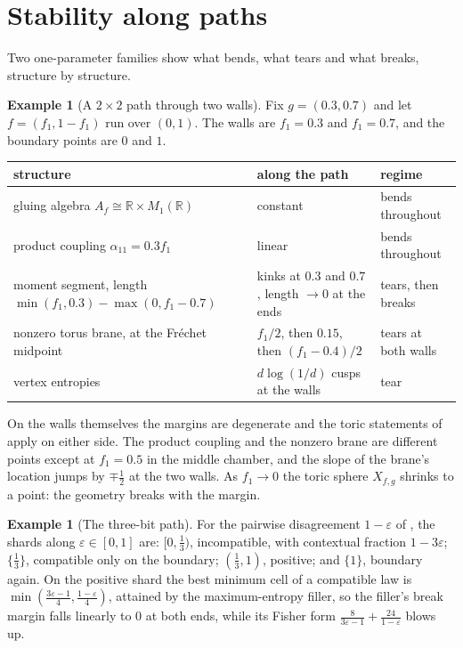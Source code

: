 \documentclass[11pt]{article}
\theoremstyle{definition}
\newtheorem{example}[theorem]{Example}
\theoremstyle{remark}
\newcommand{\R}{\mathbb{R}}
\begin{document}
\section{Stability along paths}\label{sec:paths}

Two one-parameter families show what bends, what tears and what breaks, structure by structure.

\begin{example}[A $2\times2$ path through two walls]\label{ex:path22}
Fix $g=(0.3,0.7)$ and let $f=(f_1,1-f_1)$ run over $(0,1)$. The walls are $f_1=0.3$ and $f_1=0.7$, and the boundary points are $0$ and $1$.
\begin{center}
\begin{tabular}{p{5.4cm}p{5.6cm}p{3.2cm}}
\toprule
structure & along the path & regime\\
\midrule
gluing algebra $A_f\cong\R\times M_1(\R)$ & constant & bends throughout\\
product coupling $\alpha_{11}=0.3f_1$ & linear & bends throughout\\
moment segment, length $\min(f_1,0.3)-\max(0,f_1-0.7)$ & kinks at $0.3$ and $0.7$, length $\to0$ at the ends & tears, then breaks\\
nonzero torus brane, at the Fréchet midpoint & $f_1/2$, then $0.15$, then $(f_1-0.4)/2$ & tears at both walls\\
vertex entropies & $d\log(1/d)$ cusps at the walls & tear\\
\bottomrule
\end{tabular}
\end{center}
On the walls themselves the margins are degenerate and the toric statements of \cite{Bridges} apply on either side. The product
coupling and the nonzero brane are different points except at $f_1=0.5$ in the middle chamber, and the slope of the brane's
location jumps by $\mp\frac12$ at the two walls. As $f_1\to0$ the toric sphere $X_{f,g}$ shrinks to a point: the geometry breaks with the
margin.
\end{example}

\begin{example}[The three-bit path]\label{ex:path3}
For the pairwise disagreement $1-\varepsilon$ of \cite[Ex.~3.3]{Bridges}, the shards along $\varepsilon\in[0,1]$ are: $[0,\frac13)$, incompatible,
with contextual fraction $1-3\varepsilon$; $\{\frac13\}$, compatible only on the boundary; $(\frac13,1)$, positive; and $\{1\}$, boundary
again. On the positive shard the best minimum cell of a compatible law is $\min(\frac{3\varepsilon-1}4,\frac{1-\varepsilon}4)$, attained by the
maximum-entropy filler, so the filler's break margin falls linearly to $0$ at both ends, while its Fisher form
$\frac8{3\varepsilon-1}+\frac{24}{1-\varepsilon}$ blows up.
\end{example}
\end{document}
